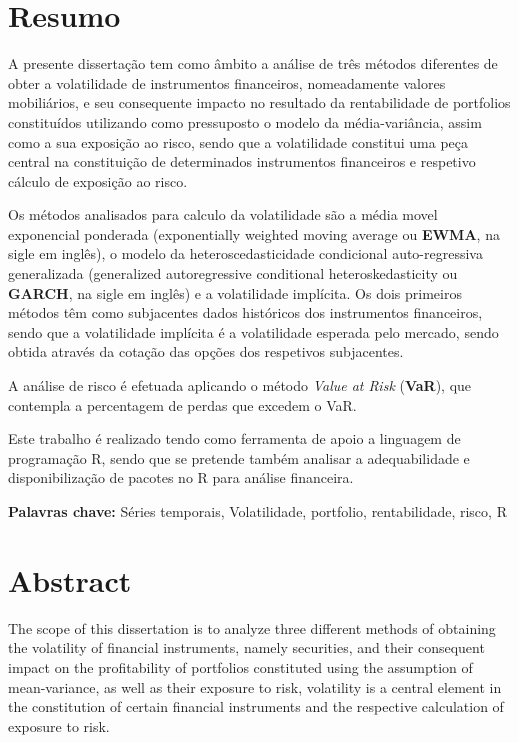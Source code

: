 \documentclass[
  12pt,
  a4paper,
  openany]{book}
\theoremstyle{definition}
\theoremstyle{definition}
\theoremstyle{definition}
\theoremstyle{remark}
\begin{document}
\clearpage

\chapter*{Resumo}
\fontsize{12}{21}\selectfont
A presente dissertação tem como âmbito a análise de três métodos diferentes de obter a volatilidade de instrumentos financeiros, nomeadamente valores mobiliários, e seu consequente impacto no resultado da rentabilidade de portfolios constituídos utilizando como pressuposto o modelo da média-variância, assim como a sua exposição ao risco, sendo que a volatilidade constitui uma peça central na constituição de determinados instrumentos financeiros e respetivo cálculo de exposição ao risco.

Os métodos analisados para calculo da volatilidade são a média movel exponencial ponderada (exponentially weighted moving average ou \textbf{EWMA}, na sigle em inglês), o modelo da heteroscedasticidade condicional auto-regressiva generalizada (generalized autoregressive conditional heteroskedasticity ou \textbf{GARCH}, na sigle em inglês) e a volatilidade implícita. Os dois primeiros métodos têm como subjacentes dados históricos dos instrumentos financeiros, sendo que a volatilidade implícita é a volatilidade esperada pelo mercado, sendo obtida através da cotação das opções dos respetivos subjacentes.

A análise de risco é efetuada aplicando o método \emph{Value at Risk} (\textbf{VaR}), que contempla a percentagem de perdas que excedem o VaR.

Este trabalho é realizado tendo como ferramenta de apoio a linguagem de programação R, sendo que se pretende também analisar a adequabilidade e disponibilização de pacotes no R para análise financeira.
\bigbreak

\noindent\textbf{Palavras chave:} Séries temporais, Volatilidade, portfolio, rentabilidade, risco, R



\setcounter{page}{2}

\chapter*{Abstract}
\fontsize{12}{21}\selectfont
The scope of this dissertation is to analyze three different methods of obtaining the volatility of financial instruments, namely securities, and their consequent impact on the profitability of portfolios constituted using the assumption of mean-variance, as well as their exposure to risk, volatility is a central element in the constitution of certain financial instruments and the respective calculation of exposure to risk.
\end{document}
